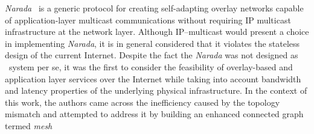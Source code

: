 
{\sl Narada}~\cite{CRZ2000,CRSZ2001,CRSZ2002} is a generic
protocol for creating self-adapting overlay networks capable of 
application-layer multicast communications without requiring IP multicast
infrastructure at the network layer.
Although IP--multicast would present a choice in implementing
{\sl Narada}, it is in general considered that it violates the 
stateless design of the current Internet.
Despite the fact the {\sl Narada} was not designed as \p\ system per se,
it was the first to consider the feasibility of overlay-based and application
layer services over the Internet while taking into account 
bandwidth and latency properties of the underlying physical infrastructure.
In the context of this work, the authors came across the 
inefficiency caused by the topology mismatch and attempted to address it 
by building an enhanced connected graph termed \emph{mesh}  %
